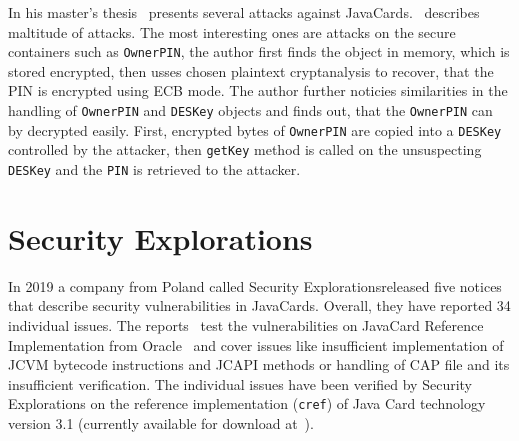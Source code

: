 

    In his master's thesis~\citeauthor{sergei} presents several attacks against JavaCards.~\cite{sergei} describes maltitude of attacks. The most interesting ones are attacks on the secure containers such as \texttt{OwnerPIN}, the author first finds the object in memory, which is stored encrypted, then usses chosen plaintext cryptanalysis to recover, that the PIN is encrypted using ECB mode. The author further noticies similarities in the handling of \texttt{OwnerPIN} and \texttt{DESKey} objects and finds out, that the \texttt{OwnerPIN} can by decrypted easily. First, encrypted bytes of \texttt{OwnerPIN} are copied into a \texttt{DESKey} controlled by the attacker, then \texttt{getKey} method is called on the unsuspecting \texttt{DESKey} and the \texttt{PIN} is retrieved to the attacker.

    \section{Security Explorations}\label{subsec:security-explorations}

    In 2019 a company from Poland called Security Explorations\footnotemark released five notices~\cite{se:oracle:part1, se:oracle:part2, se:oracle:part3, se:gemalto:part1,se:gemalto:part2} that describe security vulnerabilities in JavaCards. Overall, they have reported 34 individual issues. The reports~\cite{se:oracle:part1, se:oracle:part2,se:oracle:part3} test the vulnerabilities on JavaCard Reference Implementation from Oracle~\cite{jcspecs31download} and cover issues like insufficient implementation of JCVM bytecode instructions and JCAPI methods or handling of CAP file and its insufficient verification. The individual issues have been verified by Security Explorations on the reference implementation (\texttt{cref}) of Java Card technology version 3.1 (currently available for download at~\cite{jcspecs31download}).

